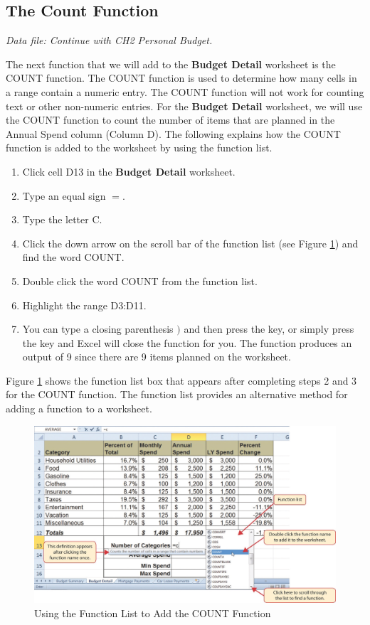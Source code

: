 \subsection{The Count Function}

\textit{Data file: Continue with CH2 Personal Budget.}

The next function that we will add to the \textbf{Budget Detail} worksheet is the COUNT function. The COUNT function is used to determine how many cells in a range contain a numeric entry. The COUNT function will not work for counting text or other non-numeric entries. For the \textbf{Budget Detail} worksheet, we will use the COUNT function to count the number of items that are planned in the Annual Spend column (Column D). The following explains how the COUNT function is added to the worksheet by using the function list.

\begin{enumerate}
	\item Click cell \textsf{D13} in the \textbf{Budget Detail} worksheet.
	\item Type an equal sign $ = $.
	\item Type the letter C.
	\item Click the down arrow on the scroll bar of the function list (see Figure \ref{02:fig17}) and find the word COUNT.
	\item Double click the word COUNT from the function list.
	\item Highlight the range \textsf{D3:D11}.
	\item You can type a closing parenthesis $ ) $ and then press the  key, or simply press the  key and Excel will close the function for you. The function produces an output of 9 since there are 9 items planned on the worksheet.
\end{enumerate}

Figure \ref{02:fig17} shows the function list box that appears after completing steps 2 and 3 for the COUNT function. The function list provides an alternative method for adding a function to a worksheet.

\begin{figure}[H]
	\centering
	\includegraphics[width=\maxwidth{.95\linewidth}]{gfx/ch02_fig17}
	\caption{Using the Function List to Add the COUNT Function}
	\label{02:fig17}
\end{figure}


